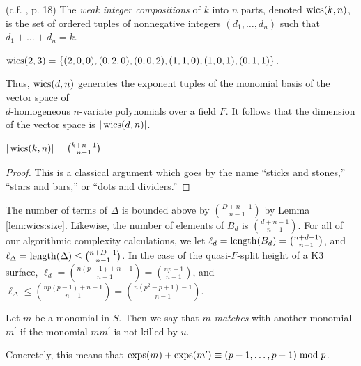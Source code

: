 \begin{defn}
    (c.f. \cite{stanley-1997-enumerative}, p. 18)
    The \textit{weak integer compositions} of $k$ into $n$ parts,
    denoted $\operatorname{wics}(k, n)$, is the set of ordered tuples of
    nonnegative integers
	\((d_{1}, \ldots, d_{n})\) such that 
    \(d_{1} + \ldots + d_{n} = k\).
\end{defn}

\begin{ex}
    $\operatorname{wics}(2, 3) = \lbrace (2, 0, 0), (0, 2, 0), (0, 0, 2), (1, 1, 0), (1, 0, 1), (0, 1, 1) \rbrace$.
\end{ex}

Thus, $\operatorname{wics}(d, n)$ generates the exponent tuples of the 
monomial basis of the vector space of \\
$d$-homogeneous 
$n$-variate polynomials over a field $F$.
It follows that the dimension of the vector space is $|\operatorname{wics}(d, n)|$.

\begin{lem}
    \label{lem:wics:size}
    $|\operatorname{wics}(k, n)| = \binom{k + n - 1}{n - 1}$
\end{lem}

\begin{proof}
	This is a classical argument which goes by the 
    name ``sticks and stones,'' ``stars and bars,'' or 
    ``dots and dividers.''
\end{proof}


\begin{rmk}
    The number of terms of \(\Delta\) is bounded 
    above by \(\binom{D+n-1}{n-1}\) by Lemma \ref{lem:wics:size}.
    Likewise, the number of elements of 
    \(B_{d}\) is \(\binom{d+n-1}{n-1}\).
    For all of our algorithmic complexity calculations, 
    we let $\ell_{d} = \operatorname{length}(B_{d}) = \binom{n + d - 1}{n - 1}$, 
    and $\ell_{\Delta} = \operatorname{length}(\Delta) \leq \binom{n + D - 1}{n - 1}$.
    In the case of the quasi-\(F\)-split height of a K3 surface, 
    $\ell_{d} = \binom{n(p - 1) + n - 1}{n - 1} = \binom{np - 1}{n - 1}$, 
    and $\ell_{\Delta} \leq \binom{np(p - 1) + n - 1}{n - 1} = \binom{n(p^2 - p + 1) - 1}{n - 1}$.
\end{rmk}

\begin{defn}
	Let \(m\) be a monomial in \(S\). 
	Then we say that \(m\) \textit{matches}
	with another monomial \(m^{\prime}\) 
	if the monomial \(mm^{\prime}\) is
	not killed by \(u\).
\end{defn}

Concretely, this means that $\operatorname{exps}(m) + \operatorname{exps}(m^{\prime}) \equiv (p - 1, \dots, p - 1) \bmod p$.

